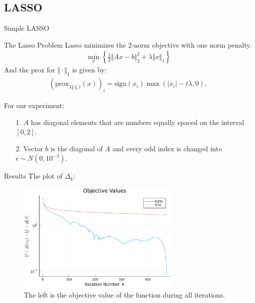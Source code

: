 \documentclass[11pt]{beamer}
\begin{document}
    \subsection{LASSO}
        \begin{frame}{Simple LASSO}
            \begin{block}{The Lasso Problem}
                Lasso minimizes the 2-norm objective with one norm penalty. 
                \begin{align*}
                    \min_{x}\left\lbrace
                        \frac{1}{2}\Vert Ax - b\Vert^2_2 + \lambda\Vert x\Vert_1    
                    \right\rbrace
                \end{align*}
                And the prox for $\Vert \cdot\Vert_1$ is given by: 
                \begin{align*}
                    (\text{prox}_{\lambda\Vert \cdot \Vert, t}(x))_i
                    = 
                    \text{sign}(x_i)\max(|x_i| - t\lambda, 0), 
                \end{align*}
            \end{block}
            For our experiment: 
            \begin{itemize}
                \item [1.] $A$ has diagonal elements that are numbers equally spaced on the interval $[0, 2]$. 
                \item [2.] Vector $b$ is the diagonal of $A$ and every odd index is changed into $\epsilon \sim  N(0, 10^{-3})$. 
            \end{itemize}
        \end{frame}
        \begin{frame}{Results}
            The plot of $\Delta_k$: 
            \begin{figure}[h]
                \centering
                \includegraphics[width=8cm]{simple_lass_obj.png}
                \caption{The left is the objective value of the function during all iterations.}
            \end{figure}
        \end{frame}
\end{document}
